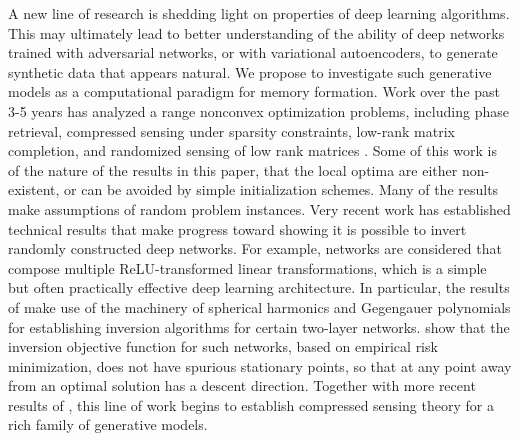 A new line of research is shedding light on properties of deep
learning algorithms. This may ultimately lead to better understanding
of the ability of deep networks trained with adversarial networks, or
with variational autoencoders, to generate synthetic data that appears
natural. We propose to investigate such generative models as a
computational paradigm for memory formation. 
Work over the past 3-5 years has analyzed a range nonconvex
optimization problems, including phase retrieval, compressed
sensing under sparsity constraints, low-rank matrix
completion, and randomized sensing of low rank matrices
\cite{phaselift_1,phaselift_2,phaselift_3,ZhaWanLiu15,WeiCaiCha16,ZheLaf15,phaselift_1,phaselift_2,phaselift_3,ZhaWanLiu15,WeiCaiCha16}.
Some of this work is of the nature of the results in this
paper, that the local optima are either non-existent, or
can be avoided by simple initialization schemes. Many of
the results make assumptions of random problem instances.
Very recent work has established technical results
that make progress toward showing it is possible to invert randomly constructed
deep networks. For example, networks are considered that compose multiple ReLU-transformed linear transformations,
which is a simple but often practically effective  deep learning architecture.
In particular, the results of \cite{Mixon18} make use of the machinery
of spherical harmonics and Gegengauer polynomials for establishing
inversion algorithms for certain two-layer networks.
\cite{HandV17} show that the inversion objective function for such networks, based
on empirical risk minimization, does not have spurious stationary points,
so that at any point away from an optimal solution has a descent
direction. Together with more recent results of \cite{HandV18},
this line of work begins to establish compressed sensing theory
for a rich family of generative models. 


